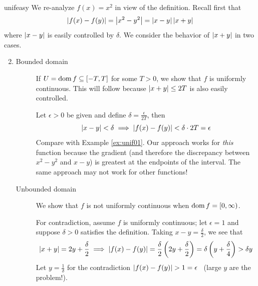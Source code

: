 \begin{examples}{}{unifeasy}
	\exstart We re-analyze $f(x)=x^2$ in view of the definition. Recall first that
	\[
		\left| f(x)-f(y)\right|=\left| x^2-y^2\right|=\left| x-y\right|\left| x+y\right|
	\]
	where $\left| x-y\right|$ is easily controlled by $\delta$. We consider the behavior of $\left| x+y\right|$ in two cases.
	\begin{enumerate}\setcounter{enumi}{1}
	  \item[]\begin{description}
	  	\item[Bounded domain] If $U=\operatorname{dom} f\subseteq [-T,T]$ for some $T>0$, we show that $f$ is uniformly continuous. This will follow because $\left| x+y\right|\le 2T$ is also easily controlled.\par
	  	Let $\epsilon>0$ be given and define $\delta =\frac\epsilon{2T}$, then
			\[
				\left| x-y\right|<\delta\implies \left| f(x)-f(y)\right|<\delta\cdot 2T=\epsilon
			\]
			Compare with Example \ref{ex:unif01}. Our approach works for \emph{this} function because the gradient (and therefore the discrepancy between $x^2-y^2$ and $x-y$) is greatest at the endpoints of the interval. The same approach may not work for other functions!
	
			\item[Unbounded domain] We show that $f$ is not uniformly continuous when $\operatorname{dom} f=[0,\infty)$.\par	
			For contradiction, assume $f$ is uniformly continuous; let $\epsilon=1$ and suppose $\delta>0$ satisfies the definition. Taking $x-y=\frac\delta 2$, we see that
			\[
				\left| x+y\right|=2y+\frac\delta 2 
				\implies\left| f(x)-f(y)\right|=\frac\delta 2\left(2y+\frac\delta 2\right) 
				=\delta\left(y+\frac\delta 4\right)>\delta y
			\]
			Let $y=\frac 1\delta$ for the contradiction $\nm{f(x)-f(y)}>1=\epsilon$ \ (large $y$ are the problem!).
		\end{description}
		

\end{enumerate}
\end{examples}
